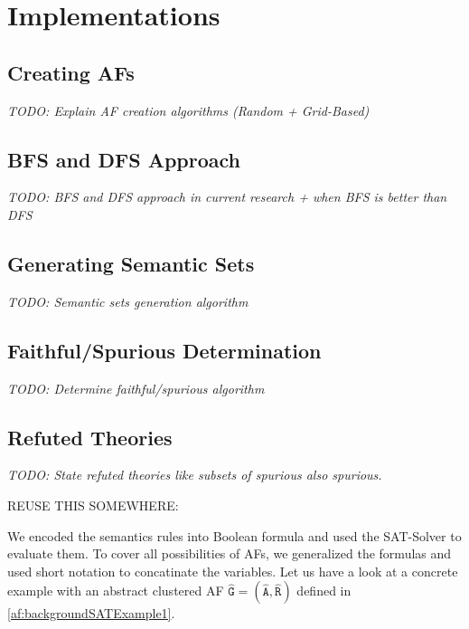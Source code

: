 \chapter{Implementations}


\section{Creating AFs}
\textit{TODO: Explain AF creation algorithms (Random + Grid-Based)}



\section{BFS and DFS Approach}
\textit{TODO: BFS and DFS approach in current research + when BFS is better than DFS}

\section{Generating Semantic Sets}
\textit{TODO: Semantic sets generation algorithm}

\section{Faithful/Spurious Determination}
\textit{TODO: Determine faithful/spurious algorithm}

\section{Refuted Theories}
\textit{TODO: State refuted theories like subsets of spurious also spurious.}




REUSE THIS SOMEWHERE:

We encoded the semantics rules into Boolean formula and used the SAT-Solver to evaluate them. To cover all possibilities of AFs, we generalized the formulas and used short notation to concatinate the variables. Let us have a look at a concrete example with an abstract clustered AF $\mathtt{\hat{G}=(\hat{A}, \hat{R})}$ defined in \cref{af:backgroundSATExample1}.



